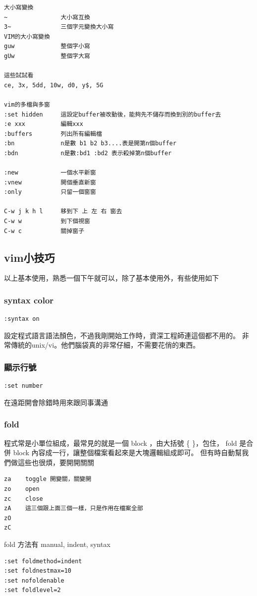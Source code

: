 \begin{verbatim}
大小寫變換
~               大小寫互換
3~              三個字元變換大小寫
VIM的大小寫變換
guw             整個字小寫
gUw             整個字大寫

這些試試看
ce, 3x, 5dd, 10w, d0, y$, 5G
	  
vim的多檔與多窗
:set hidden     這設定buffer被改動後，能夠先不儲存而換到別的buffer去
:e xxx          編輯xxx
:buffers        列出所有編輯檔
:bn             n是數 b1 b2 b3....表是開第n個buffer
:bdn            n是數:bd1 :bd2 表示殺掉第n個buffer 

:new            一個水平新窗
:vnew           開個垂直新窗
:only           只留一個窗窗

C-w j k h l     移到下 上 左 右 窗去
C-w w           到下個視窗
C-w c           關掉窗子
\end{verbatim}
    \subsection{vim小技巧}
      以上基本使用，熟悉一個下午就可以，除了基本使用外，有些使用如下
      \subsubsection{syntax color}
      \begin{verbatim}
:syntax on
      \end{verbatim}
      設定程式語言語法顏色，不過我剛開始工作時，資深工程師連這個都不用的。
      非常傳統的unix/vi。他們腦袋真的非常仔細，不需要花俏的東西。

      \subsubsection{顯示行號}
      \begin{verbatim}
:set number
      \end{verbatim}
      在遠距開會除錯時用來跟同事溝通

      \subsubsection{fold}
      程式常是小單位組成，最常見的就是一個 block ，由大括號 \{ \}，包住，
      fold 是合併 block 內容成一行，讓整個檔案看起來是大塊邏輯組成即可。
      但有時自動幫我們做這些也很煩，要開開關關
      \begin{verbatim}
za    toggle 開變關，關變開
zo    open
zc    close
zA    這三個跟上面三個一樣，只是作用在檔案全部
zO
zC
      \end{verbatim}
      fold 方法有 manual, indent, syntax
      \begin{verbatim}
:set foldmethod=indent
:set foldnestmax=10
:set nofoldenable
:set foldlevel=2
      \end{verbatim}
